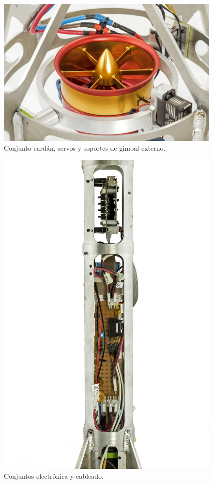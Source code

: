 \begin{figure}[htb]
    \centering
    \includegraphics[width=\linewidth]{fig/hq/gimbal_close.jpg}
    \caption{Conjunto cardán, servos y soportes de gimbal externo.}
    \label{fig:hq/gimbal_close}
\end{figure}

\begin{figure}[htb]
    \centering
    \includegraphics[width=\linewidth]{fig/hq/electronics.jpg}
    \caption{Conjuntos electrónica y cableado.}
    \label{fig:hq/electronics}
\end{figure}

